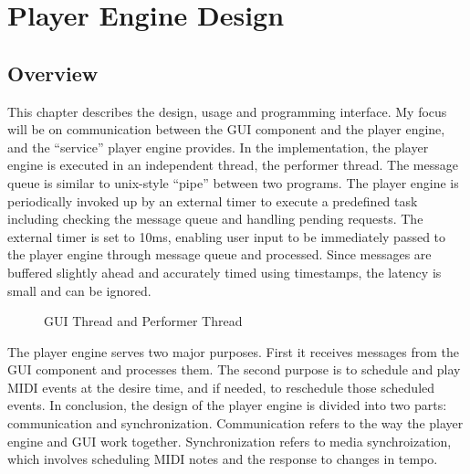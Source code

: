
\chapter{Player Engine Design} %

\section{Overview}
This chapter describes the design, usage and programming interface. My focus 
will be on communication between the GUI component and the player engine, and 
the ``service'' player engine provides. In the implementation, the player 
engine is executed in an independent thread, the performer thread. The 
message queue is similar to unix-style ``pipe'' between two programs. The 
player engine is periodically invoked up by an external timer to 
execute a predefined task including checking the message queue and handling 
pending requests. The external timer is set to 10ms, enabling user 
input to be immediately passed to the player engine through message queue and 
processed. Since messages are buffered slightly ahead and accurately timed 
using timestamps, the latency is small and can be ignored.

\begin{figure}[H]
\caption{GUI Thread and Performer Thread}
\end{figure}

The player engine serves two major purposes. First it receives
messages from the GUI component and processes them. The second purpose is to 
schedule and play MIDI events at the desire time, and if needed, to
reschedule those scheduled events. In conclusion, the design of the player 
engine is divided into two parts: communication and synchronization. 
Communication refers to the way the player engine and GUI work together. 
Synchronization refers to media synchroization, which involves scheduling 
MIDI notes and the response to changes in tempo. 

